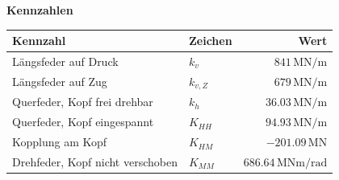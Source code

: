 \documentclass[11pt,a4paper]{article}
\begin{document}
\noindent\textbf{Kennzahlen}
\begin{longtable}{llr}
\hline
Kennzahl & Zeichen & Wert \\
\hline
\endhead
Längsfeder auf Druck & $k_v$ & $841\,\mathrm{MN}/\mathrm{m}$ \\
Längsfeder auf Zug & $k_{v,Z}$ & $679\,\mathrm{MN}/\mathrm{m}$ \\
Querfeder, Kopf frei drehbar & $k_h$ & $36.03\,\mathrm{MN}/\mathrm{m}$ \\
Querfeder, Kopf eingespannt & $K_{HH}$ & $94.93\,\mathrm{MN}/\mathrm{m}$ \\
Kopplung am Kopf & $K_{HM}$ & $-201.09\,\mathrm{MN}$ \\
Drehfeder, Kopf nicht verschoben & $K_{MM}$ & $686.64\,\mathrm{MNm}/\mathrm{rad}$ \\
\hline
\end{longtable}
\end{document}
